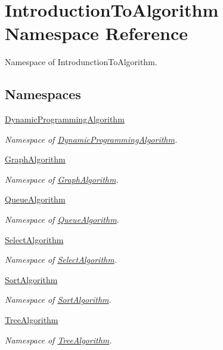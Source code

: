 \hypertarget{namespace_introduction_to_algorithm}{}\section{Introduction\+To\+Algorithm Namespace Reference}
\label{namespace_introduction_to_algorithm}


Namespace of Introdunction\+To\+Algorithm.  


\subsection*{Namespaces}
\begin{DoxyCompactItemize}
\item 
 \hyperlink{namespace_introduction_to_algorithm_1_1_dynamic_programming_algorithm}{Dynamic\+Programming\+Algorithm}
\begin{DoxyCompactList}\small\item\em Namespace of \hyperlink{namespace_introduction_to_algorithm_1_1_dynamic_programming_algorithm}{Dynamic\+Programming\+Algorithm}. \end{DoxyCompactList}\item 
 \hyperlink{namespace_introduction_to_algorithm_1_1_graph_algorithm}{Graph\+Algorithm}
\begin{DoxyCompactList}\small\item\em Namespace of \hyperlink{namespace_introduction_to_algorithm_1_1_graph_algorithm}{Graph\+Algorithm}. \end{DoxyCompactList}\item 
 \hyperlink{namespace_introduction_to_algorithm_1_1_queue_algorithm}{Queue\+Algorithm}
\begin{DoxyCompactList}\small\item\em Namespace of \hyperlink{namespace_introduction_to_algorithm_1_1_queue_algorithm}{Queue\+Algorithm}. \end{DoxyCompactList}\item 
 \hyperlink{namespace_introduction_to_algorithm_1_1_select_algorithm}{Select\+Algorithm}
\begin{DoxyCompactList}\small\item\em Namespace of \hyperlink{namespace_introduction_to_algorithm_1_1_select_algorithm}{Select\+Algorithm}. \end{DoxyCompactList}\item 
 \hyperlink{namespace_introduction_to_algorithm_1_1_sort_algorithm}{Sort\+Algorithm}
\begin{DoxyCompactList}\small\item\em Namespace of \hyperlink{namespace_introduction_to_algorithm_1_1_sort_algorithm}{Sort\+Algorithm}. \end{DoxyCompactList}\item 
 \hyperlink{namespace_introduction_to_algorithm_1_1_tree_algorithm}{Tree\+Algorithm}
\begin{DoxyCompactList}\small\item\em Namespace of \hyperlink{namespace_introduction_to_algorithm_1_1_tree_algorithm}{Tree\+Algorithm}. \end{DoxyCompactList}\end{DoxyCompactItemize}


